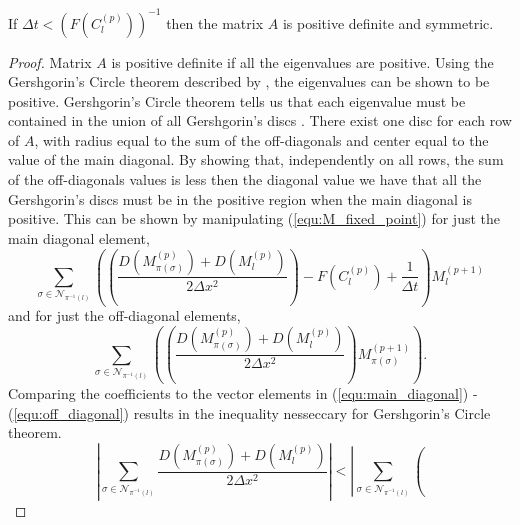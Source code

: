 \begin{prop} \label{prop:pos_sym}
 If $ \Delta t < \left( { F(C^{(p)}_{l}) } \right)^{-1}$ then the matrix $A$ is positive definite and symmetric.
\end{prop}
\begin{proof}
  Matrix $A$ is positive definite if all the eigenvalues are positive. 
  Using the Gershgorin's Circle theorem described by \cite{varga2004gersgorin}, the eigenvalues can be shown to be positive.
  Gershgorin's Circle theorem tells us that each eigenvalue must be contained in the union of all Gershgorin's discs \citep{varga2004gersgorin}.
  There exist one disc for each row of $A$, with radius equal to the sum of the off-diagonals and center equal to the value of the main diagonal.
  By showing that, independently on all rows, the sum of the off-diagonals values is less then the diagonal value we have that all the Gershgorin's discs must be in the positive region when the main diagonal is positive.
  This can be shown by manipulating (\ref{equ:M_fixed_point}) for just the main diagonal element,
  \begin{equation} \label{equ:main_diagonal}
    \sum_{\sigma \in \mathcal{N}_{\pi^{-1}(l)}} \left( 
      \left( \frac{D(M_{\pi(\sigma)}^{(p)}) + D(M_l^{(p)})}{2\Delta x^2} \right)
      - F(C_l^{(p)}) + \frac{1}{\Delta t} \right) M_l^{(p+1)}
  \end{equation}
  and for just the off-diagonal elements,
  \begin{equation} \label{equ:off_diagonal}
    \sum_{\sigma \in \mathcal{N}_{\pi^{-1}(l)}} \left( 
      \left( \frac{D(M_{\pi(\sigma)}^{(p)}) + D(M_l^{(p)})}{2\Delta x^2} \right)
      M_{\pi(\sigma)}^{(p+1)} \right).
  \end{equation}
  Comparing the coefficients to the vector elements in (\ref{equ:main_diagonal}) - (\ref{equ:off_diagonal}) results in the inequality nesseccary for Gershgorin's Circle theorem.
  \begin{equation} \label{equ:diagonalGreatOffdiagonal}
    \left| \sum_{\sigma \in \mathcal{N}_{\pi^{-1}(l)}} 
      \frac{D(M_{\pi(\sigma)}^{(p)}) + D(M_l^{(p)})}{2\Delta x^2} 
      \right| 
    <
    \left| \sum_{\sigma \in \mathcal{N}_{\pi^{-1}(l)}} \left( 

\end{equation}
\end{proof}
